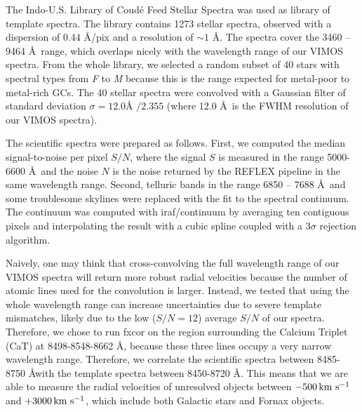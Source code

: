 \documentclass[useAMS,usenatbib]{mn2e}
\newcommand{\kms}{\mbox{\,km~s$^{-1}$}}
\begin{document}
The Indo-U.S. Library of Coud\'e Feed Stellar Spectra \citep{Valdes04} was used as library of template spectra. The library contains 1273 stellar spectra, observed with a dispersion of $0.44$ \AA /pix and a resolution of $\sim 1$ \AA . The spectra cover the 3460 -- 9464 \AA\ range, which overlaps nicely with the wavelength range of our VIMOS spectra. From the whole library, we selected a random subset of 40 stars with spectral types from \textit{F} to \textit{M} because this is the range expected for metal-poor to metal-rich GCs. The 40 stellar spectra were convolved with a Gaussian filter of standard deviation $\sigma = 12.0\mbox{\AA\ } / 2.355$ (where 12.0 \AA\ is the FWHM resolution of our VIMOS spectra). 

The scientific spectra were prepared as follows. First, we computed the median signal-to-noise per pixel $S/N$, where the signal $S$ is measured in the range 5000-6600 \AA\ and the noise $N$ is the noise returned by the REFLEX pipeline in the same wavelength range. Second, telluric bands in the range 6850 -- 7688 \AA\ and some troublesome skylines were replaced with the fit to the spectral continuum. The continuum was computed with iraf/continuum by averaging ten contiguous pixels and interpolating the result with a cubic spline coupled with a $3\sigma$ rejection algorithm.  

Naively, one may think that cross-convolving the full wavelength range of our VIMOS spectra will return more robust radial velocities because the number of atomic lines used for the convolution is larger. Instead, we tested that using the whole wavelength range can increase uncertainties due to severe template mismatches, likely due to the low ($S/N = 12$) average $S/N$ of our spectra. Therefore, we chose to run fxcor on the region surrounding the Calcium Triplet (CaT) at 8498-8548-8662 \AA , because these three lines occupy a very narrow wavelength range. Therefore, we correlate the scientific spectra between 8485-8750 \AA with the template spectra between 8450-8720 \AA . This means that we are able to measure the radial velocities of unresolved objects between $-500 \kms$ and $+3000\kms$, which include both Galactic stars and Fornax objects.   
\end{document}
